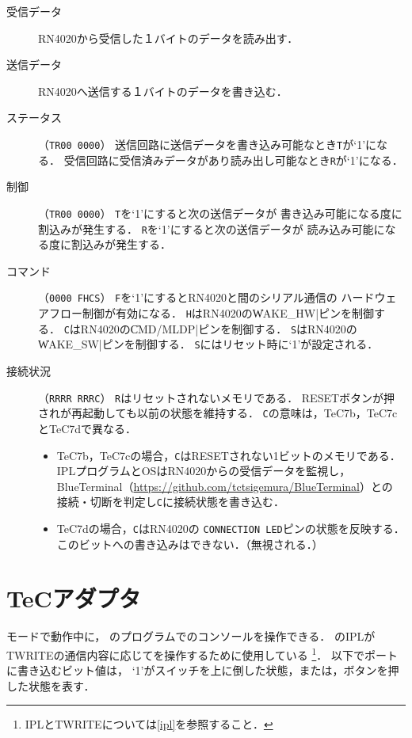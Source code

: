\begin{description}
\item[受信データ]
  RN4020から受信した１バイトのデータを読み出す．
\item[送信データ]
  RN4020へ送信する１バイトのデータを書き込む．
\item[ステータス]（\texttt{TR00 0000}）
  送信回路に送信データを書き込み可能なとき\texttt{T}が`1'になる．
  受信回路に受信済みデータがあり読み出し可能なとき\texttt{R}が`1'になる．
\item[制御]（\texttt{TR00 0000}）
  \texttt{T}を`1'にすると次の送信データが
  書き込み可能になる度に割込みが発生する．
  \texttt{R}を`1'にすると次の送信データが
  読み込み可能になる度に割込みが発生する．
\item[コマンド]（\texttt{0000 FHCS}）
  \texttt{F}を`1'にするとRN4020と{\tac}間のシリアル通信の
  ハードウェアフロー制御が有効になる．
  \texttt{H}はRN4020の\|WAKE_HW|ピンを制御する．
  \texttt{C}はRN4020の\|CMD/MLDP|ピンを制御する．
  \texttt{S}はRN4020の\|WAKE_SW|ピンを制御する．
  \texttt{S}にはリセット時に`1'が設定される．
\item[接続状況]（\texttt{RRRR RRRC}）
  \texttt{R}はリセットされないメモリである．
  RESETボタンが押され{\tac}が再起動しても以前の状態を維持する．
  \texttt{C}の意味は，TeC7b，TeC7cとTeC7dで異なる．
  \begin{itemize}
  \item TeC7b，TeC7cの場合，\texttt{C}はRESETされない1ビットのメモリである．
    IPLプログラムとOSはRN4020からの受信データを監視し，
    BlueTerminal（\url{https://github.com/tctsigemura/BlueTerminal}）との
    接続・切断を判定し\texttt{C}に接続状態を書き込む．
  \item TeC7dの場合，\texttt{C}はRN4020の
    \texttt{CONNECTION LED}ピンの状態を反映する．
    このビットへの書き込みはできない．（無視される．）
  \end{itemize}
\end{description}

\section{TeCアダプタ}
{\tec}モードで動作中に，
{\tac}のプログラムで{\tec}のコンソールを操作できる．
{\tac}のIPLがTWRITEの通信内容に応じて{\tec}を操作するために使用している
\footnote{IPLとTWRITEについては\ref{ipl}を参照すること．}．
以下でポートに書き込むビット値は，
`1'がスイッチを上に倒した状態，または，ボタンを押した状態を表す．

